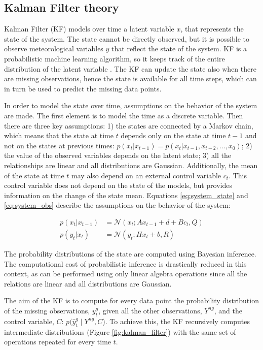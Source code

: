 \documentclass{article}
\newcommand{\norm}[3]{\mathcal{N}\left(#1; #2, #3\right)} %
\let\Oldsubsection\subsection
\renewcommand{\subsection}{\FloatBarrier\Oldsubsection}
\begin{document}
\subsection{Kalman Filter theory}

Kalman Filter (KF) models over time a latent variable $x$, that represents the state of the system. The state cannot be directly observed, but it is possible to observe meteorological variables $y$ that reflect the state of the system.
KF is a probabilistic machine learning algorithm, so it keeps track of the entire distribution of the latent variable \cite{bishop_pattern_2006}.
The KF can update the state also when there are missing observations, hence the state is available for all time steps, which can in turn be used to predict the missing data points.

In order to model the state over time, assumptions on the behavior of the system are made. The first element is to model the time as a discrete variable.  Then there are three key assumptions: 1) the states are connected by a Markov chain, which means that the state at time $t$ depends only on the state at time $t-1$ and not on the states at previous times: $p(x_t|x_{t-1}) = p(x_t|x_{t-1}, x_{t-2}, \hdots, x_0)$; 2) the value of the observed variables depends on the latent state; 3) all the relationships are linear and all distributions are Gaussian. Additionally, the mean of the state at time $t$ may also depend on an external control variable $c_t$. This control variable does not depend on the state of the models, but provides information on the change of the state mean.
Equations \ref{eq:system_state} and \ref{eq:system_obs} describe the assumptions on the behavior of the system:

\begin{align}
p(x_t | x_{t-1}) &= \norm{x_t}{Ax_{t-1} + d + Bc_t}{Q} \label{eq:system_state}\\
p(y_t | x_t) &= \norm{y_t}{Hx_t + b}{R} \label{eq:system_obs}
\end{align}

The probability distributions of the state are computed using Bayesian inference. The computational cost of probabilistic inference is drastically reduced in this context, as can be performed using only linear algebra operations since all the relations are linear and all distributions are Gaussian.

The aim of the KF is to compute for every data point the probability distribution of the missing observations, $y^g_t$, given all the other observations, $Y^{ng}$, and the control variable, $C$: $p(\hat{y}^g_t \mid Y^{ng}, C$). To achieve this, the KF recursively computes intermediate distributions (Figure \ref{fig:kalman_filter}) with the same set of operations repeated for every time $t$.
\end{document}
